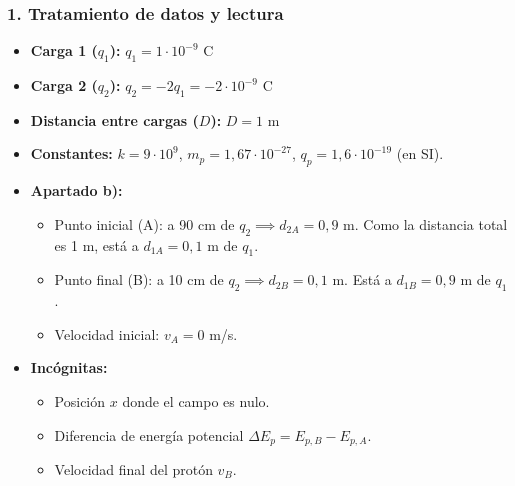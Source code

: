 \subsubsection*{1. Tratamiento de datos y lectura}
\begin{itemize}
    \item \textbf{Carga 1 ($q_1$):} $q_1 = 1 \cdot 10^{-9} \text{ C}$
    \item \textbf{Carga 2 ($q_2$):} $q_2 = -2 q_1 = -2 \cdot 10^{-9} \text{ C}$
    \item \textbf{Distancia entre cargas ($D$):} $D = 1 \text{ m}$
    \item \textbf{Constantes:} $k = 9\cdot10^{9}$, $m_p=1,67\cdot10^{-27}$, $q_p=1,6\cdot10^{-19}$ (en SI).
    \item \textbf{Apartado b):}
        \begin{itemize}
            \item Punto inicial (A): a 90 cm de $q_2 \implies d_{2A} = 0,9$ m. Como la distancia total es 1 m, está a $d_{1A} = 0,1$ m de $q_1$.
            \item Punto final (B): a 10 cm de $q_2 \implies d_{2B} = 0,1$ m. Está a $d_{1B} = 0,9$ m de $q_1$.
            \item Velocidad inicial: $v_A = 0$ m/s.
        \end{itemize}
    \item \textbf{Incógnitas:}
        \begin{itemize}
            \item Posición $x$ donde el campo es nulo.
            \item Diferencia de energía potencial $\Delta E_p = E_{p,B} - E_{p,A}$.
            \item Velocidad final del protón $v_B$.
        \end{itemize}
\end{itemize}

